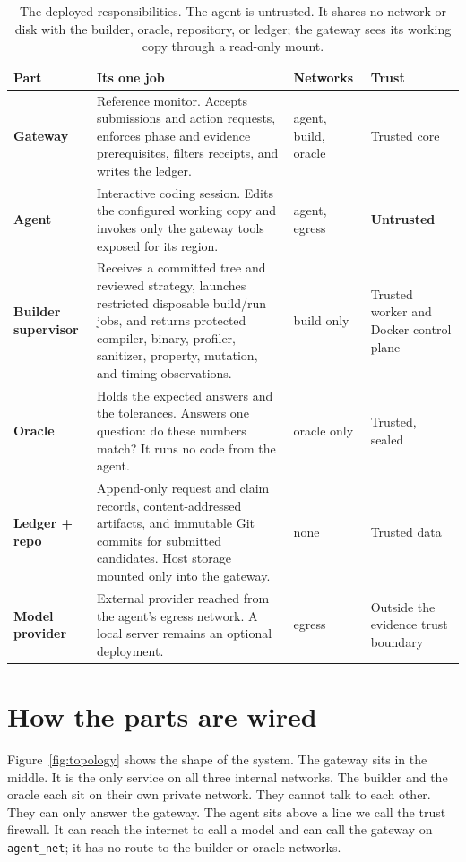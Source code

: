 \documentclass[11pt]{article}
\newcommand{\code}[1]{\texttt{#1}}
\begin{document}
\begin{table}[htbp]
\centering\small
\begin{tabular}{@{}p{}p{}p{}p{}@{}}
\toprule
\textbf{Part} & \textbf{Its one job} & \textbf{Networks} & \textbf{Trust} \\
\midrule
\textbf{Gateway} & Reference monitor. Accepts submissions and action requests,
enforces phase and evidence prerequisites, filters receipts, and writes the
ledger. & agent, build, oracle & Trusted core \\
\addlinespace
\textbf{Agent} & Interactive coding session. Edits the configured working copy
and invokes only the gateway tools exposed for its region. & agent, egress &
\textbf{Untrusted} \\
\addlinespace
\textbf{Builder supervisor} & Receives a committed tree and reviewed strategy,
launches restricted disposable build/run jobs, and returns protected compiler,
binary, profiler, sanitizer, property, mutation, and timing observations. &
build only & Trusted worker and Docker control plane \\
\addlinespace
\textbf{Oracle} & Holds the expected answers and the tolerances. Answers one
question: do these numbers match? It runs no code from the agent. & oracle only
& Trusted, sealed \\
\addlinespace
\textbf{Ledger + repo} & Append-only request and claim records, content-addressed
artifacts, and immutable Git commits for submitted candidates. Host storage
mounted only into the gateway. & none & Trusted data \\
\addlinespace
\textbf{Model provider} & External provider reached from the agent's egress
network. A local server remains an optional deployment. & egress & Outside the
evidence trust boundary \\
\bottomrule
\end{tabular}
\caption{The deployed responsibilities. The agent is untrusted. It shares no
network or disk with the builder, oracle, repository, or ledger; the gateway
sees its working copy through a read-only mount.}
\label{tab:components}
\end{table}

\section{How the parts are wired}

Figure~\ref{fig:topology} shows the shape of the system. The gateway sits
in the middle. It is the only service on all three internal networks. The builder and the oracle
each sit on their own private network. They cannot talk to each other. They can
only answer the gateway. The agent sits above a line we call the trust
firewall. It can reach the internet to call a model and can call the gateway on
\code{agent\_net}; it has no route to the builder or oracle networks.
\end{document}
